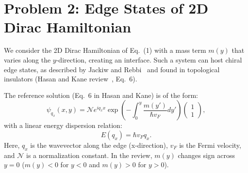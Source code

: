 \documentclass{article}
\begin{document}
    \section{Problem 2: Edge States of 2D Dirac Hamiltonian}
	We consider the 2D Dirac Hamiltonian of Eq.~(1) with a mass term $m(y)$ that varies along the $y$-direction, creating an interface. Such a system can host chiral edge states, as described by Jackiw and Rebbi~\cite{JR} and found in topological insulators (Hasan and Kane review~\cite{HK}, Eq.~6).
	
	The reference solution (Eq.~6 in Hasan and Kane) is of the form:
	\begin{equation} \label{eq:kane_hazan_6_main}
		\psi_{q_x}(x,y) = \mathcal{N} e^{i q_x x} \exp\left(-\int_0^y \frac{m(y')}{\hbar v_F} dy'\right) \begin{pmatrix} 1 \\ 1 \end{pmatrix},
	\end{equation}
	with a linear energy dispersion relation:
	\begin{equation} \label{eq:edge_dispersion_main}
		E(q_x) = \hbar v_F q_x.
	\end{equation}
	Here, $q_x$ is the wavevector along the edge (x-direction), $v_F$ is the Fermi velocity, and $\mathcal{N}$ is a normalization constant. In the review, $m(y)$ changes sign across $y=0$ ($m(y) < 0$ for $y<0$ and $m(y) > 0$ for $y>0$).
	
\end{document}
